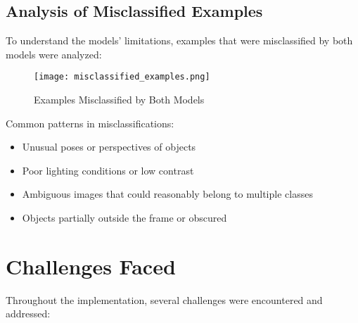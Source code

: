 \documentclass[12pt]{article}
\begin{document}
\subsection{Analysis of Misclassified Examples}
To understand the models' limitations, examples that were misclassified by both models were analyzed:

\begin{figure}[h]
    \centering
    \texttt{[image: misclassified\_examples.png]}
    \caption{Examples Misclassified by Both Models}
\end{figure}

Common patterns in misclassifications:
\begin{itemize}
    \item Unusual poses or perspectives of objects
    \item Poor lighting conditions or low contrast
    \item Ambiguous images that could reasonably belong to multiple classes
    \item Objects partially outside the frame or obscured
\end{itemize}

\section{Challenges Faced}

Throughout the implementation, several challenges were encountered and addressed:
\end{document}

